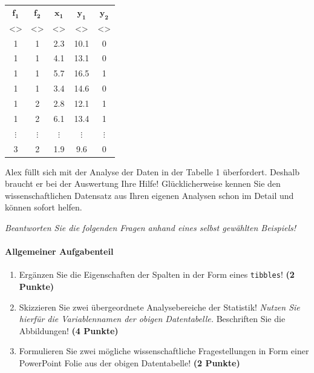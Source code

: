 \documentclass[a4paper, 9pt]{scrartcl}\usepackage[]{graphicx}\usepackage[]{xcolor}
\begin{document}
\begin{table}[h]
\centering
\Large
  \begin{tabular}{ccccc}
  \toprule
   $\boldsymbol{f_1}$  & $\boldsymbol{f_2}$ & $\boldsymbol{x_1}$ & $\boldsymbol{y_1}$ & $\boldsymbol{y_2}$ \\[2pt]
     <\phantom{xxxxx}>  & <\phantom{xxxxx}> & <\phantom{xxxxx}> & <\phantom{xxxxx}> & <\phantom{xxxxx}> \\[2pt] 
  \midrule
  1  & 1 & 2.3 & 10.1 & 0 \\  
  1  & 1 & 4.1 & 13.1 & 0 \\ 
  1  & 1 & 5.7 & 16.5 & 1 \\ 
  1  & 1 & 3.4 & 14.6 & 0 \\
  1  & 2 & 2.8 & 12.1 & 1 \\
  1  & 2 & 6.1 & 13.4 & 1 \\
  $\vdots$  & $\vdots$ & $\vdots$ & $\vdots$ & $\vdots$\\
  3 & 2  & 1.9 & 9.6 &  0\\
  \bottomrule
  \end{tabular}
\end{table}

Alex füllt sich mit der Analyse der Daten in der Tabelle 1 überfordert. Deshalb braucht er bei der Auswertung Ihre Hilfe! Glücklicherweise kennen Sie den wissenschaftlichen Datensatz aus Ihren eigenen Analysen schon im Detail und können sofort helfen.

\begin{graybox}{}
\textit{Beantworten Sie die folgenden Fragen anhand eines selbst gewählten Beispiels!}
\end{graybox}

\paragraph{Allgemeiner Aufgabenteil} 

\begin{enumerate}
  \setcounter{enumi}{0}
  \item Ergänzen Sie die Eigenschaften der Spalten in der Form eines \texttt{tibbles}! \textbf{(2 Punkte)}
  \item Skizzieren Sie zwei übergeordnete Analysebereiche der Statistik! \textit{Nutzen Sie hierfür die Variablennamen der obigen Datentabelle.} Beschriften Sie die Abbildungen! \textbf{(4 Punkte)}
  \item Formulieren Sie zwei mögliche wissenschaftliche Fragestellungen in Form einer PowerPoint Folie aus der obigen Datentabelle! \textbf{(2 Punkte)}
\end{enumerate}
\end{document}

